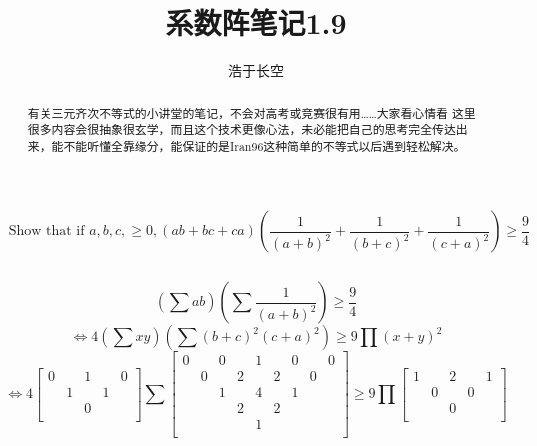\documentclass[UTF8]{ctexart}
\begin{document}
\title{系数阵笔记1.9}
\author{浩于长空}
\maketitle
$$\text { Show that if } a, b, c,\geq 0,(a b+b c+c a)\left(\dfrac{1}{(a+b)^{2}}+\dfrac{1}{(b+c)^{2}}+\dfrac{1}{(c+a)^{2}}\right) \geq \dfrac{9}{4}
$$
\begin{flushright}
\end{flushright}
\begin{displaymath}
\end{displaymath}
\begin{abstract}
	有关三元齐次不等式的小讲堂的笔记，不会对高考或竞赛很有用……大家看心情看
	这里很多内容会很抽象很玄学，而且这个技术更像心法，未必能把自己的思考完全传达出来，能不能听懂全靠缘分，能保证的是Iran96这种简单的不等式以后遇到轻松解决。
\end{abstract}
\newpage
$$ (\displaystyle \sum ab)(\displaystyle \sum \dfrac{1}{(a+b)^{2}})\geq \dfrac{9}{4}$$
$$\Leftrightarrow 
4(\displaystyle \sum xy)(\displaystyle \sum (b+c)^{2}(c+a)^{2})\geq 9\displaystyle \prod (x+y)^{2}$$
$$\Leftrightarrow 
4\left[
\begin{smallmatrix}
	0& &1& &0\\
	&1& &1&\\
	& &0& &\\
\end{smallmatrix}
\right]
\displaystyle \sum \left[
\begin{smallmatrix}
	0& &0& &1& &0& &0\\
	&0& &2& &2& &0&\\
	& &1& &4& &1& &\\
	& & &2& &2& & &\\
	& & & &1& & & &\\
\end{smallmatrix}
\right]\geq 9\displaystyle \prod 
\left[
\begin{smallmatrix}
	1& &2& &1\\
	&0& &0&\\
	& &0& &\\
\end{smallmatrix}
\right]
$$
\end{document}
